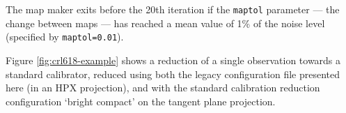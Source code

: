 \documentclass[twocolumn]{aastex6}
\newcommand{\note}[1]{\textcolor{red}{Note: #1}}
\begin{document}
The map maker exits before the 20th iteration if the \texttt{maptol}
parameter --- the change between maps --- has reached a mean value of 1\%
of the noise level (specified by \texttt{maptol=0.01}).






Figure \ref{fig:crl618-example} shows a reduction of a single
observation towards a standard calibrator, reduced using both the
legacy configuration file presented here (in an HPX projection), and
with the standard calibration reduction configuration `bright compact'
on the tangent plane projection.
\end{document}
